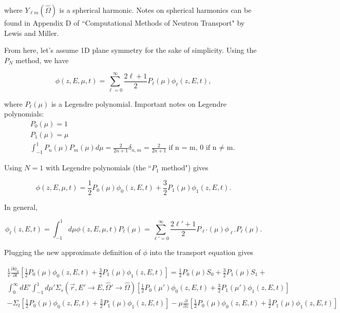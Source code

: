 \documentclass[12pt]{article}
\newcommand{\rvec}{\ensuremath{\vec{r}}}
\newcommand{\omvec}{\ensuremath{\hat{\Omega}}}
\newcommand{\sigs}{\ensuremath{\Sigma_s(\rvec,E'\rightarrow E,\omvec'\rightarrow\omvec)}}
\newcommand{\el}{\ensuremath{\ell}}
\begin{document}
where $Y_{\el m}(\omvec)$ is a spherical harmonic. Notes on spherical harmonics can be found in Appendix D
of ``Computational Methods of Neutron Transport" by Lewis and Miller.


From here, let's assume 1D plane symmetry for the sake of simplicity. Using the $P_N$ method, we have

\begin{equation*}
\phi(z,E,\mu,t) = \sum_{\el=0}^{\infty}\frac{2\el+1}{2}P_{\el}(\mu)\phi_{\el}(z,E,t),
\end{equation*}

where $P_{\ell}(\mu)$ is a Legendre polynomial. Important notes on Legendre polynomials:
\begin{gather*}
P_0(\mu) = 1 \\
P_1(\mu) = \mu \\
\int_{-1}^{1}P_n(\mu)P_m(\mu)d\mu = 
\frac{2}{2n+1}\delta_{n,m}=\frac{2}{2n+1}\text{if n = m, 0 if n $\neq$ m.}
\end{gather*}

Using $N=1$ with Legendre polynomials (the ``$P_1$ method") gives

\begin{equation*}
\phi(z,E,\mu,t) = \frac{1}{2}P_0(\mu)\phi_0(z,E,t) + \frac{3}{2}P_1(\mu)\phi_1(z,E,t).
\end{equation*}

In general,

\begin{equation*}
\phi_{\el}(z,E,t) = \int^{1}_{-1}d\mu\phi(z,E,\mu,t)P_{\el}(\mu) 
= \sum_{\el'=0}^{\infty}\frac{2\el'+1}{2}P_{\ell'}(\mu)\phi_{\el'}P_{\ell}(\mu).
\end{equation*}

Plugging the new approximate definition of $\phi$ into the transport equation gives

\begin{multline*}
\frac{1}{v}\frac{\partial\phi_n}{\partial t}\left[\frac{1}{2}P_0(\mu)\phi_0(z,E,t) + \frac{3}{2}P_1(\mu)\phi_1(z,E,t)\right] = 
\frac{1}{2}P_0(\mu)S_0 + \frac{3}{2}P_1(\mu)S_1 + \\ 
\int^{\infty}_{0}dE'\int^{1}_{-1}d\mu'\sigs\left[\frac{1}{2}P_0(\mu')\phi_0(z,E,t) + \frac{3}{2}P_1(\mu')\phi_1(z,E,t)\right] \\
- \Sigma_t\left[\frac{1}{2}P_0(\mu)\phi_0(z,E,t) + \frac{3}{2}P_1(\mu)\phi_1(z,E,t)\right]
- \mu\frac{\partial}{\partial z}\left[\frac{1}{2}P_0(\mu)\phi_0(z,E,t) + \frac{3}{2}P_1(\mu)\phi_1(z,E,t)\right]
\end{multline*}
\end{document}
